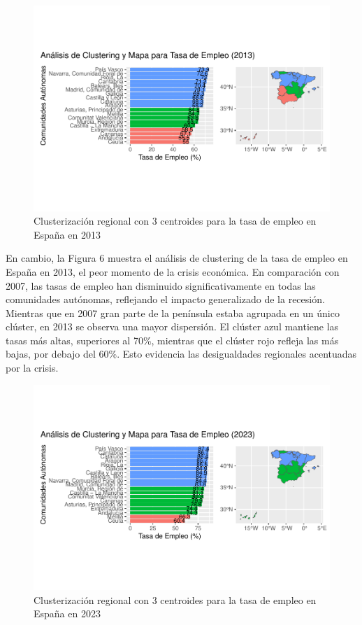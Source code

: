 \documentclass[Universitat de
València,article,submit,moreauthors,pdftex]{Definitions/mdpi}
\begin{document}
\begin{figure}[h]

{\centering \includegraphics[width=0.9\linewidth]{ProyectoAED2024_files/figure-latex/unnamed-chunk-36-1} 

}

\caption{Clusterización regional con 3 centroides para la tasa de empleo en España en 2013}\label{fig:unnamed-chunk-36}
\end{figure}

En cambio, la Figura 6 muestra el análisis de clustering de la tasa de
empleo en España en 2013, el peor momento de la crisis económica. En
comparación con 2007, las tasas de empleo han disminuido
significativamente en todas las comunidades autónomas, reflejando el
impacto generalizado de la recesión. Mientras que en 2007 gran parte de
la península estaba agrupada en un único clúster, en 2013 se observa una
mayor dispersión. El clúster azul mantiene las tasas más altas,
superiores al 70\%, mientras que el clúster rojo refleja las más bajas,
por debajo del 60\%. Esto evidencia las desigualdades regionales
acentuadas por la crisis.\newline

\begin{figure}[h]

{\centering \includegraphics[width=0.9\linewidth]{ProyectoAED2024_files/figure-latex/unnamed-chunk-37-1} 

}

\caption{Clusterización regional con 3 centroides para la tasa de empleo en España en 2023}\label{fig:unnamed-chunk-37}
\end{figure}
\end{document}
